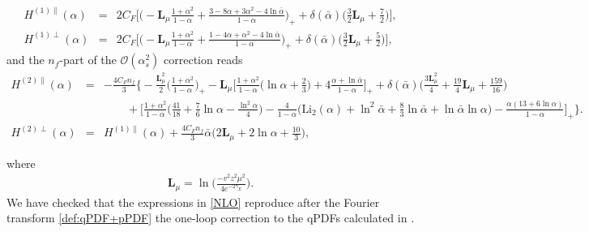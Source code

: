 \begin{widetext}
\begin{eqnarray}
\label{NLO}
H^{(1)\parallel}(\alpha)&=&2C_F\Bigg[
\bigg(-\mathbf{L}_\mu \frac{1+\alpha^2}{1-\alpha}+\frac{3-8\alpha+3\alpha^2-4\ln\bar \alpha}{1-\alpha}\bigg)_+
+\delta(\bar \alpha)\bigg(\frac{3}{2}\mathbf{L}_\mu+\frac{7}{2}\bigg)\Bigg],
\\
H^{(1)\perp}(\alpha)&=&2C_F\Bigg[
 \bigg(-\mathbf{L}_\mu \frac{1+\alpha^2}{1-\alpha}+\frac{1-4\alpha+\alpha^2-4\ln\bar \alpha}{1-\alpha}\bigg)_+
 +\delta(\bar \alpha)\bigg(\frac{3}{2}\mathbf{L}_\mu+\frac{5}{2}\bigg)\Bigg],
\end{eqnarray}
and the $n_f$-part of the $\mathcal{O}(\alpha_s^2)$ correction reads 
\begin{eqnarray}
\label{NNLO}
H^{(2)\parallel}(\alpha)&=&
-\frac{4C_Fn_f}{3}\biggl\{-\frac{\mathbf{L}_\mu^2}{2}\Big(\frac{1+\alpha^2}{1-\alpha}\Big)_+-\mathbf{L}_\mu \Big[\frac{1+\alpha^2}{1-\alpha}\Big(\ln\alpha+\frac{2}{3}\Big)+4\frac{\alpha+\ln\bar \alpha}{1-\alpha}\Big]_+
+\delta(\bar \alpha)\Big(\frac{3\mathbf{L}_\mu^2}{4}+\frac{19}{4}\mathbf{L}_\mu+\frac{159}{16}\Big)
\\\nonumber && \qquad+\Big[\frac{1+\alpha^2}{1-\alpha}\Big(\frac{41}{18}+\frac{7}{6}\ln\alpha-\frac{\ln^2\alpha}{4}\Big)
-\frac{4}{1-\alpha}\Big(\text{Li}_2(\alpha)+\ln^2\bar \alpha+\frac{8}{3}\ln\bar \alpha+\ln \bar \alpha \ln\alpha\Big)
-\frac{\alpha(13+6\ln \alpha)}{1-\alpha}\Big]_+ \biggr\}.
\\
H^{(2)\perp}(\alpha)&=&H^{(1)\parallel}(\alpha)+\frac{4C_Fn_f}{3}\bar \alpha\Big(2\mathbf{L}_\mu+2\ln\alpha+\frac{10}{3}\Big),
\end{eqnarray}
\end{widetext}
where
\begin{eqnarray}
\mathbf{L}_\mu=\ln\bigg(\frac{-v^2z^2\mu^2}{4e^{-2\gamma_E}}\bigg).
\end{eqnarray}
We have checked that the expressions in \eqref{NLO} reproduce after the Fourier transform \eqref{def:qPDF+pPDF}
the one-loop correction to the qPDFs calculated in \cite{Xiong:2013bka,Stewart:2017tvs}. 

%
